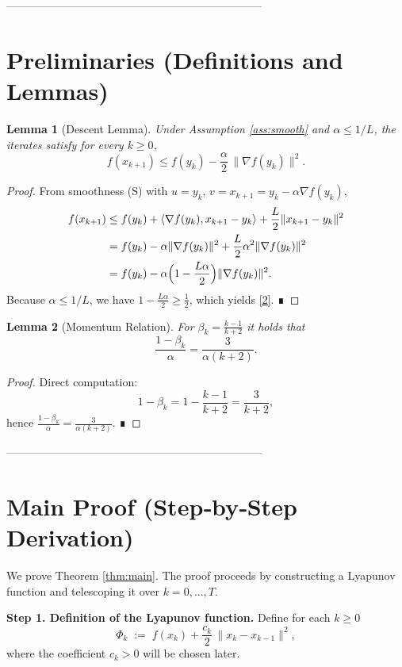 \documentclass{article}
\newtheorem{lemma}{Lemma}
\newcommand{\grad}{\nabla}
\begin{document}
---------------------------------------------------------------------

\section*{Preliminaries (Definitions and Lemmas)}
\begin{lemma}[Descent Lemma]\label{lem:descent}
Under Assumption \ref{ass:smooth} and $\alpha\le 1/L$, the iterates satisfy for every $k\ge0$,
\[
f(x_{k+1})\le f(y_k)-\frac{\alpha}{2}\,\|\grad f(y_k)\|^2 .
\tag{2}
\]
\end{lemma}
\begin{proof}
From smoothness (S) with $u=y_k$, $v=x_{k+1}=y_k-\alpha\grad f(y_k)$,
\[
\begin{aligned}
f(x_{k+1}) &\le f(y_k)+\langle\grad f(y_k),x_{k+1}-y_k\rangle+\frac{L}{2}\|x_{k+1}-y_k\|^2\\
&= f(y_k)-\alpha\|\grad f(y_k)\|^2+\frac{L}{2}\alpha^{2}\|\grad f(y_k)\|^2\\
&= f(y_k)-\alpha\Bigl(1-\frac{L\alpha}{2}\Bigr)\|\grad f(y_k)\|^2 .
\end{aligned}
\]
Because $\alpha\le 1/L$, we have $1-\frac{L\alpha}{2}\ge\frac12$, which yields \eqref{2}. ∎
\end{proof}

\begin{lemma}[Momentum Relation]\label{lem:beta}
For $\beta_k=\frac{k-1}{k+2}$ it holds that
\[
\frac{1-\beta_k}{\alpha}= \frac{3}{\alpha(k+2)} .
\tag{3}
\]
\end{lemma}
\begin{proof}
Direct computation:
\[
1-\beta_k = 1-\frac{k-1}{k+2}= \frac{3}{k+2},
\]
hence $\frac{1-\beta_k}{\alpha}= \frac{3}{\alpha(k+2)}$. ∎
\end{proof}

---------------------------------------------------------------------

\section*{Main Proof (Step‑by‑Step Derivation)}
We prove Theorem \ref{thm:main}.  The proof proceeds by constructing a Lyapunov function and telescoping it over $k=0,\dots,T$.

\noindent\textbf{Step 1. Definition of the Lyapunov function.}  
Define for each $k\ge0$
\[
\Phi_k \;:=\; f(x_k)+\frac{c_k}{2}\,\|x_k-x_{k-1}\|^2,
\tag{4}
\]
where the coefficient $c_k>0$ will be chosen later.  
\end{document}
